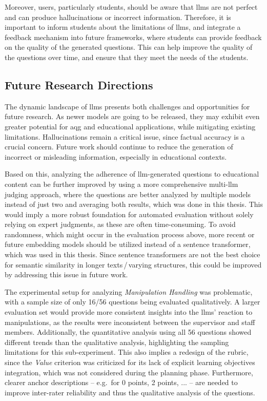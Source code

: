 Moreover, users, particularly students, should be aware that \acp{llm} are not perfect and can produce hallucinations or incorrect information. Therefore, it is important to inform students about the limitations of \acp{llm}, and integrate a feedback mechanism into future frameworks, where students can provide feedback on the quality of the generated questions. This can help improve the quality of the questions over time, and ensure that they meet the needs of the students.

\subsection{Future Research Directions}

The dynamic landscape of \acp{llm} presents both challenges and opportunities for future research. As newer models are going to be released, they may exhibit even greater potential for \ac{aqg} and educational applications, while mitigating existing limitations. Hallucinations remain a critical issue, since factual accuracy is a crucial concern. Future work should continue to reduce the generation of incorrect or misleading information, especially in educational contexts.

\pagebreak

Based on this, analyzing the adherence of \ac{llm}-generated questions to educational content can be further improved by using a more comprehensive multi-\ac{llm} judging approach, where the questions are better analyzed by multiple models instead of just two and averaging both results, which was done in this thesis. This would imply a more robust foundation for automated evaluation without solely relying on expert judgments, as these are often time-consuming. To avoid randomness, which might occur in the evaluation process above, more recent or future embedding models should be utilized instead of a sentence transformer, which was used in this thesis. Since sentence transformers are not the best choice for semantic similarity in longer texts\,/\,varying structures, this could be improved by addressing this issue in future work.

The experimental setup for analyzing \textit{Manipulation Handling} was problematic, with a sample size of only 16/56 questions being evaluated qualitatively. A larger evaluation set would provide more consistent insights into the \acp{llm}' reaction to manipulations, as the results were inconsistent between the supervisor and staff members. Additionally, the quantitative analysis using all 56 questions showed different trends than the qualitative analysis, highlighting the sampling limitations for this sub-experiment. This also implies a redesign of the rubric, since the \textit{Value} criterion was criticized for its lack of explicit learning objectives integration, which was not considered during the planning phase. Furthermore, clearer anchor descriptions -- e.g.\ for 0 points, 2 points, ... -- are needed to improve inter-rater reliability and thus the qualitative analysis of the questions.

